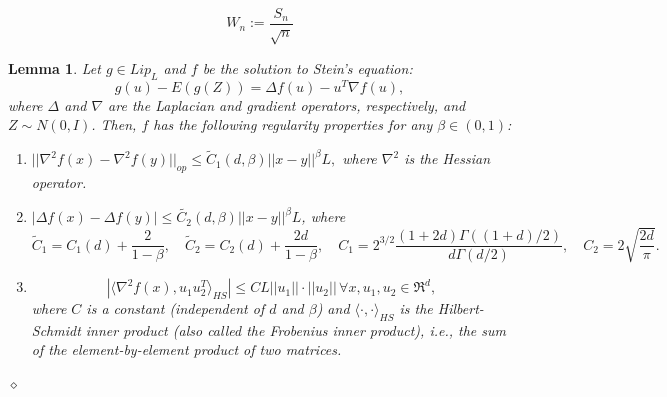 \documentclass[10pt,a4paper]{amsart}
\newtheorem{lemma}{Lemma}
\begin{document}
\begin{equation}\label{eq: normalized sum}
W_n:=\frac{S_n}{\sqrt{n}}
\end{equation}

\begin{lemma}\label{lem: regularity}
Let $g\in Lip_L$ and $f$ be the solution to Stein's equation:
\begin{equation}\label{eq: Stein}
    g(u)-E(g(Z))=\Delta f(u)-u^T\nabla f(u),
\end{equation}
where $\Delta$ and $\nabla$ are the Laplacian and gradient operators, respectively, and $Z\sim N(0,I)$. Then, $f$ has the following regularity properties for any $\beta\in (0,1)$:
\begin{enumerate}
    \item $||\nabla^2f(x)-\nabla^2f(y)||_{op}\leq \tilde{C}_1(d,\beta)||x-y||^\beta L,$ where $\nabla^2$ is the Hessian operator.
    \item $|\Delta f(x)-\Delta f(y)|\leq \tilde{C_2}(d,\beta)||x-y||^\beta L$,
where  $$\tilde{C}_1=C_1(d)+\frac{2}{1-\beta}, \quad \tilde{C}_2=C_2(d)+\frac{2d}{1-\beta}, \quad 
C_1=2^{3/2}\frac{(1+2d)\Gamma((1+d)/2)}{d\Gamma(d/2)},\quad C_2=2\sqrt{\frac{2d}{\pi}}.$$
    \item  $$\left|\langle\nabla^2 f(x),u_1u_2^T\rangle_{HS}\right|\leq C L||u_1||\cdot||u_2||\,\forall x, u_1, u_2\in \Re^d,$$ where $C$ is a constant (independent of $d$ and $\beta$) and $\langle\cdot,\cdot\rangle_{HS}$ is the Hilbert-Schmidt inner product (also called the Frobenius inner product), i.e., the sum of the element-by-element product of two matrices.
\end{enumerate}
\hfill $\diamond$
\end{lemma}
\end{document}
